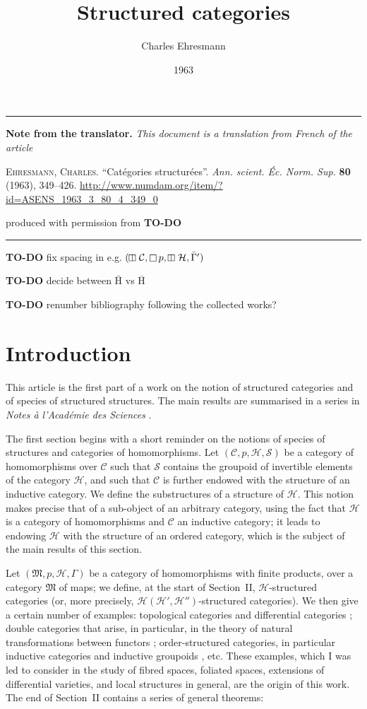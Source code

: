 \documentclass[fleqn]{article}
\title{Structured categories}
\author{Charles Ehresmann}
\date{1963}
\newcommand{\origcit}{%
  \textsc{Ehresmann, Charles.}
  ``Catégories structurées''.
  \emph{Ann. scient. Éc. Norm. Sup.} \textbf{80} (1963), 349--426.
  \url{http://www.numdam.org/item/?id=ASENS_1963_3_80_4_349_0}
}
\newenvironment{itenv}[1]
  {\phantomsection\par\medskip\noindent\textbf{#1.}\itshape}
  {\par\medskip}
\newcommand{\oldpage}[1]{\marginpar{\footnotesize$\Big\vert$ \textit{p.~#1}}}
\newcommand{\todo}{{\color{purple}\textbf{TO-DO }}}
\newcommand{\CC}{\mathcal{C}}
\newcommand{\HH}{\mathcal{H}}
\newcommand{\rHH}{\mathrm{H}}
\renewcommand{\SS}{\mathcal{S}}
\newcommand{\MM}{\mathfrak{M}}
\DeclareMathOperator{\sq}{\square}
\DeclareMathOperator{\vsq}{\raisebox{-.1em}{\rotatebox{90}{$\boxminus$}\,}}
\begin{document}
\maketitle

\hrule
\begin{itenv}{Note from the translator}
This document is a translation from French of the article

\medskip
{\normalfont\origcit}

\medskip
produced with permission from \todo
\end{itenv}
\hrule

\tableofcontents


\todo fix spacing in e.g. $(\vsq\CC,\sq p,\vsq\HH,\bar{\Gamma}')$

\todo decide between $\bar{\rHH}$ vs $\overline{\rHH}$

\todo renumber bibliography following the collected works?

\section*{Introduction}

\oldpage{349}

This article is the first part of a work on the notion of structured categories and of species of structured structures.
The main results are summarised in a series in \emph{Notes à l'Académie des Sciences} \cite{3e}.

The first section begins with a short reminder on the notions of species of structures and categories of homomorphisms.
Let $(\CC,p,\HH,\SS)$ be a category of homomorphisms over $\CC$ such that $\SS$ contains the groupoid of invertible elements of the category $\HH$, and such that $\CC$ is further endowed with the structure of an inductive category.
We define the substructures of a structure of $\HH$.
This notion makes precise that of a sub-object of an arbitrary category, using the fact that $\HH$ is a category of homomorphisms and $\CC$ an inductive category;
it leads to endowing $\HH$ with the structure of an ordered category, which is the subject of the main results of this section.

Let $(\MM,p,\HH,\Gamma)$ be a category of homomorphisms with finite products, over a category $\MM$ of maps;
we define, at the start of Section~II, $\HH$-structured categories (or, more precisely, $\HH(\HH',\HH'')$-structured categories).
We then give a certain number of examples: topological categories and differential categories \cite{3b}; double categories that arise, in particular, in the theory of natural transformations between functors \cite{3d}; order-structured categories, in particular inductive categories and inductive groupoids \cite{3c}, etc.
\oldpage{350}
These examples, which I was led to consider in the study of fibred spaces, foliated spaces, extensions of differential varieties, and local structures in general, are the origin of this work.
The end of Section~II contains a series of general theorems:
\end{document}
